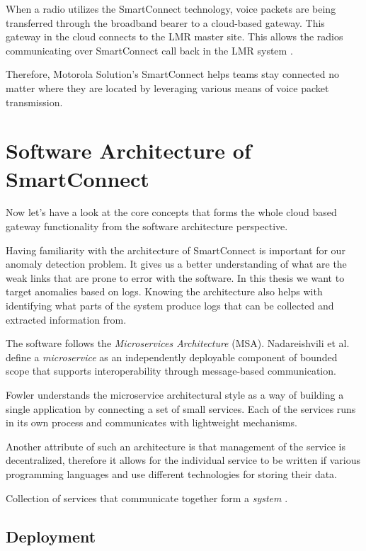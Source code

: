 When a radio utilizes the SmartConnect technology, voice packets are being transferred through the broadband bearer to a cloud-based gateway. This gateway in the cloud connects to the LMR master site. This allows the radios communicating over SmartConnect call back in the LMR system \cite{apxnextslides}.

Therefore, Motorola Solution's SmartConnect helps teams stay connected no matter where they are located by leveraging various means of voice packet transmission.

\section{Software Architecture of SmartConnect}
\label{smart-connect:architecture}

Now let's have a look at the core concepts that forms the whole cloud based gateway functionality from the software architecture perspective. 

Having familiarity with the architecture of SmartConnect is important for our anomaly detection problem. It gives us a better understanding of what are the weak links that are prone to error with the software. 
In this thesis we want to target anomalies based on logs. Knowing the architecture also helps with identifying what parts of the system produce logs that can be collected and extracted information from.

The software follows the \textit{Microservices Architecture} (MSA).
Nadareishvili et al. \cite{nadareishvili2016microservice} define a \textit{microservice} as an independently deployable component of bounded scope that supports interoperability through message-based communication. 

Fowler \cite{fowler2014microservices} understands the microservice architectural style as a way of building a single application by connecting a set of small services. Each of the services runs in its own process and communicates with lightweight mechanisms.

Another attribute of such an architecture is that management of the service is decentralized, therefore it allows for the individual service to be written if various programming languages and use different technologies for storing their data.

Collection of services that communicate together form a \textit{system} \cite{indrasiri2018microservices}.

\subsection{Deployment}

